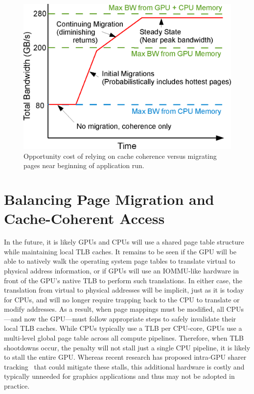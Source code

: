 \begin{figure}[t]
    \includegraphics[width=\columnwidth]{hpca2015/figures/opportunity.eps} 
    \caption{Opportunity cost of relying on cache coherence versus migrating pages near beginning of application run.}
    \label{fig:opportunity}
\end{figure}

\vspace{-0.05in}
\section{Balancing Page Migration and Cache-Coherent Access}
\label{threshold}

In the future, it is likely GPUs and CPUs will use a shared page table structure
while maintaining local TLB caches.  It remains to be seen if the GPU will be
able to natively walk the operating system page tables to translate virtual to
physical address information, or if GPUs will use an IOMMU-like hardware in
front of the GPU's native TLB to perform such translations.  In either case, the
translation from virtual to physical addresses will be implicit, just as it is
today for CPUs, and will no longer require trapping back to the CPU to translate
or modify addresses.  As a result, when page mappings must be modified, all
CPUs---and now the GPU---must follow appropriate steps to safely invalidate
their local TLB caches.  While CPUs typically use a TLB per CPU-core, GPUs use a
multi-level global page table across all compute pipelines.  Therefore, when TLB
shootdowns occur, the penalty will not stall just a single CPU pipeline, it is
likely to stall the entire GPU\@. Whereas recent research has proposed intra-GPU
sharer tracking~\cite{Villavieja2011} that could mitigate these stalls, this
additional hardware is costly and typically unneeded for graphics applications
and thus may not be adopted in practice.

